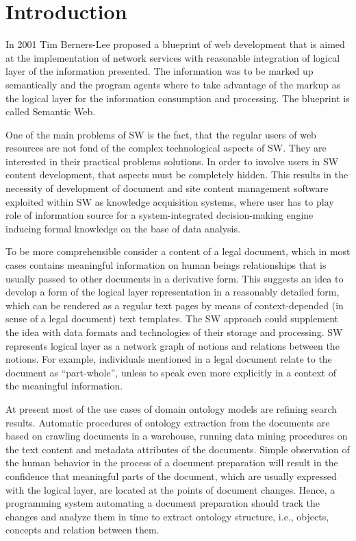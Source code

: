 \documentclass[conference]{IEEEtran}
\begin{document}
\section{Introduction}
In 2001 Tim Berners-Lee proposed a blueprint \cite{TBL2001} of web development that is aimed at the implementation of network services with reasonable integration of logical layer of the information presented.  The information was to be marked up semantically and the program agents where to take advantage of the markup as the logical layer for the information consumption and processing.  The blueprint is called Semantic Web.

One of the main problems of SW is the fact, that the regular users of web resources are not fond of the complex technological aspects of SW. They are interested in their practical problems solutions.  In order to involve users in SW content development, that aspects must be completely hidden.  This results in the necessity of development of document and site content management software exploited within SW as knowledge acquisition systems, where user has to play role of information source for a system-integrated decision-making engine inducing formal knowledge on the base of data analysis.

To be more comprehensible consider a content of a legal document, which in most cases contains meaningful information on human beings relationships that is usually passed to other documents in a derivative form.  This suggests an idea to develop a form of the logical layer representation in a reasonably detailed form, which can be rendered as a regular text pages by means of context-depended (in sense of a legal document) text templates.  The SW approach could supplement the idea with data formats and technologies of their storage and processing.  SW represents logical layer as a network graph of notions and relations between the notions.  For example, individuals mentioned in a legal document relate to the document as “part-whole”, unless to speak even more explicitly in a context of the meaningful information.

At present most of the use cases of domain ontology models are
refining search results.  Automatic procedures of ontology extraction
from the documents are based on crawling documents in a warehouse,
running data mining procedures on the text content and metadata
attributes of the documents.  Simple observation of the human behavior
in the process of a document preparation will result in the confidence
that meaningful parts of the document, which are usually expressed
with the logical layer, are located at the points of document changes.
Hence, a programming system automating a document preparation should
track the changes and analyze them in time to extract ontology structure,
i.e., objects, concepts and relation between them.
\end{document}

